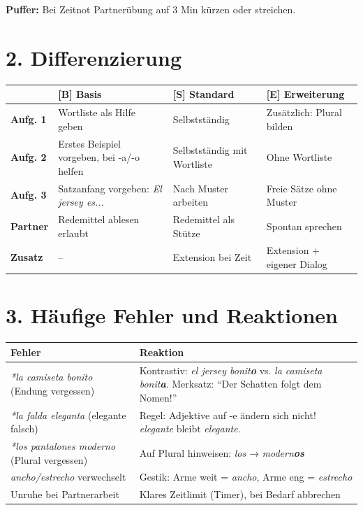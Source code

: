 \documentclass[11pt, a4paper]{article}
\newcommand{\basis}{\textcolor{basisgreen}{\textbf{[B]}}}
\newcommand{\standard}{\textcolor{standardblue}{\textbf{[S]}}}
\newcommand{\erweiterung}{\textcolor{erweiterungpurple}{\textbf{[E]}}}
\begin{document}
\textbf{Puffer:} Bei Zeitnot Partnerübung auf 3 Min kürzen oder streichen.


\section*{2. Differenzierung}

\begin{tabular}{|l|p{4cm}|p{4cm}|p{4cm}|}
\hline
& \textbf{\basis{} Basis} & \textbf{\standard{} Standard} & \textbf{\erweiterung{} Erweiterung} \\
\hline
\textbf{Aufg. 1} &
Wortliste als Hilfe geben &
Selbstständig &
Zusätzlich: Plural bilden \\
\hline
\textbf{Aufg. 2} &
Erstes Beispiel vorgeben, bei -a/-o helfen &
Selbstständig mit Wortliste &
Ohne Wortliste \\
\hline
\textbf{Aufg. 3} &
Satzanfang vorgeben: \textit{El jersey es...} &
Nach Muster arbeiten &
Freie Sätze ohne Muster \\
\hline
\textbf{Partner} &
Redemittel ablesen erlaubt &
Redemittel als Stütze &
Spontan sprechen \\
\hline
\textbf{Zusatz} &
-- &
Extension bei Zeit &
Extension + eigener Dialog \\
\hline
\end{tabular}


\section*{3. Häufige Fehler und Reaktionen}

\begin{tabular}{|p{5cm}|p{8.5cm}|}
\hline
\textbf{Fehler} & \textbf{Reaktion} \\
\hline
\textit{*la camiseta bonito} (Endung vergessen) &
Kontrastiv: \textit{el jersey bonit\textbf{o}} vs. \textit{la camiseta bonit\textbf{a}}. Merksatz: ``Der Schatten folgt dem Nomen!'' \\
\hline
\textit{*la falda eleganta} (elegante falsch) &
Regel: Adjektive auf -e ändern sich nicht! \textit{elegante} bleibt \textit{elegante}. \\
\hline
\textit{*los pantalones moderno} (Plural vergessen) &
Auf Plural hinweisen: \textit{los} → \textit{modern\textbf{os}} \\
\hline
\textit{ancho/estrecho} verwechselt &
Gestik: Arme weit = \textit{ancho}, Arme eng = \textit{estrecho} \\
\hline
Unruhe bei Partnerarbeit &
Klares Zeitlimit (Timer), bei Bedarf abbrechen \\
\hline
\end{tabular}
\end{document}
